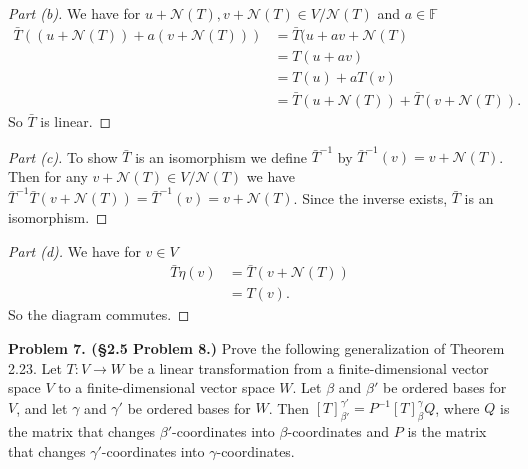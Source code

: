\documentclass[leqno]{article}
\theoremstyle{nonumberplain}
\newtheorem{proof}{Proof}
\begin{document}
\begin{proof}[Part (b)]
We have for $u+\mathcal{N}(T),v+\mathcal{N}(T)\in V/\mathcal{N}(T)$ and $a\in \mathbb{F}$
\begin{align*}
\bar{T}((u+\mathcal{N}(T))+a(v+\mathcal{N}(T)))&=\bar{T}(u+av+\mathcal{N}(T)\\
&=T(u+av)\\
&=T(u)+aT(v)\\
&=\bar{T}(u+\mathcal{N}(T))+\bar{T}(v+\mathcal{N}(T)).
\end{align*}
So $\bar{T}$ is linear.
\end{proof}

\begin{proof}[Part (c)]
To show $\bar{T}$ is an isomorphism we define $\bar{T}^{-1}$ by $\bar{T}^{-1}(v)=v+\mathcal{N}(T)$.  Then for any $v+\mathcal{N}(T)\in V/\mathcal{N}(T)$ we have $\bar{T}^{-1}\bar{T}(v+\mathcal{N}(T))=\bar{T}^{-1}(v)=v+\mathcal{N}(T)$. Since the inverse exists, $\bar{T}$ is an isomorphism.
\end{proof}

\begin{proof}[Part (d)]
We have for $v\in V$
\begin{align*}
\bar{T}\eta(v)&=\bar{T}(v+\mathcal{N}(T))\\
&=T(v).
\end{align*}
So the diagram commutes.
\end{proof}

\pagebreak






\noindent\textbf{Problem 7. (\S 2.5 Problem 8.)} Prove the following generalization of Theorem 2.23. Let $T\colon V\to W$ be a linear transformation from a finite-dimensional vector space $V$ to a finite-dimensional vector space $W$. Let $\beta$ and $\beta'$ be ordered bases for $V$, and let $\gamma$ and $\gamma'$ be ordered bases for $W$. Then $[T]_{\beta'}^{\gamma'} = P^{-1}[T]_\beta^\gamma Q$, where $Q$ is the matrix that changes $\beta'$-coordinates into $\beta$-coordinates and $P$ is the matrix that changes $\gamma'$-coordinates into $\gamma$-coordinates.
\end{document}
